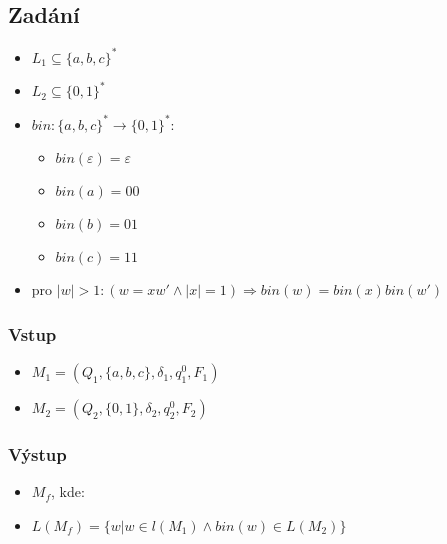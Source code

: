 \documentclass[11pt, a4paper]{article}
\begin{document}
\subsection*{Zadání}
\begin{itemize}[label={},noitemsep]
	\item $ L_1 \subseteq \{a, b, c\}^*$
	\item $ L_2 \subseteq \{0, 1\}^* $
	\item $ bin: \{a, b, c\}^* \rightarrow \{0, 1\}^* $:
	      \begin{itemize}[label={},noitemsep]
	      	\item $ bin(\varepsilon) = \varepsilon $
	      	\item $ bin(a) = 00 $
	      	\item $ bin(b) = 01 $
	      	\item $ bin(c) = 11 $
	      \end{itemize}
	\item pro $ |w| > 1:  (w = xw' \wedge |x| = 1) \Rightarrow bin(w) = bin(x) bin(w') $
\end{itemize}

\begin{multicols}{2}
	\subsubsection*{Vstup}
	\begin{itemize}[label={},noitemsep]
		\item $ M_1 = (Q_1, \{a, b, c\}, \delta_1, q_1^0, F_1)$
		\item $ M_2 = (Q_2, \{0, 1\}, \delta_2, q_2^0, F_2)$
	\end{itemize}
	\columnbreak
	\subsubsection*{Výstup}
	\begin{itemize}[label={},noitemsep]
		\item $ M_f $, kde:
		\item $ L(M_f) = \{w | w \in l(M_1) \wedge bin(w) \in L(M_2)\} $
	\end{itemize}
\end{multicols}
\end{document}
